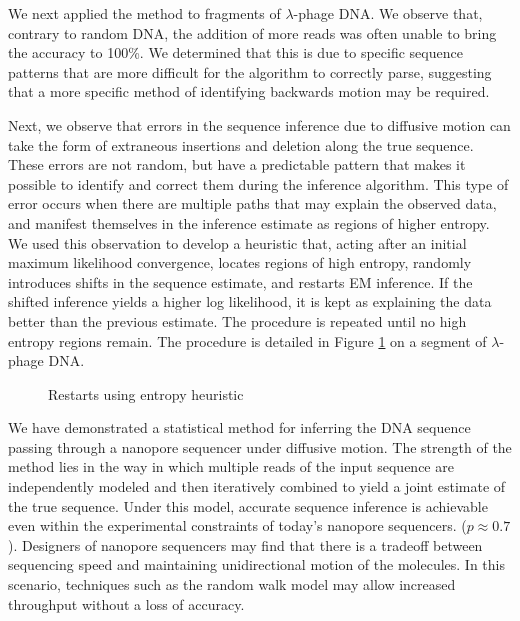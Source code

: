 \documentclass{biophys_letter}
\begin{document}
We next applied the method to fragments of $\lambda$-phage DNA.
We observe that, contrary to random DNA, the addition of more reads was often unable to bring the accuracy to 100\%.
We determined that this is due to specific sequence patterns that are more difficult for the algorithm to correctly parse, suggesting that a more specific method of identifying backwards motion may be required.

Next, we observe that errors in the sequence inference due to diffusive motion can take the form of extraneous insertions and deletion along the true sequence.
These errors are not random, but have a predictable pattern that makes it possible to identify and correct them during the inference algorithm.
This type of error occurs when there are multiple paths that may explain the observed data, and manifest themselves in the inference estimate as regions of higher entropy.
We used this observation to develop a heuristic that, acting after an initial maximum likelihood convergence, locates regions of high entropy, randomly introduces shifts in the sequence estimate, and restarts EM inference.
If the shifted inference yields a higher log likelihood, it is kept as explaining the data better than the previous estimate.
The procedure is repeated until no high entropy regions remain.
The procedure is detailed in Figure \ref{fig:entropy_restarts} on a segment of $\lambda$-phage DNA.

\begin{figure}
\caption{Restarts using entropy heuristic}
\label{fig:entropy_restarts}
\end{figure}

We have demonstrated a statistical method for inferring the DNA sequence passing through a nanopore sequencer under diffusive motion.
The strength of the method lies in the way in which multiple reads of the input sequence are independently modeled and then iteratively combined to yield a joint estimate of the true sequence.
Under this model, accurate sequence inference is achievable even within the experimental constraints of today's nanopore sequencers. ($p \approx 0.7$).
Designers of nanopore sequencers may find that there is a tradeoff between sequencing speed and maintaining unidirectional motion of the molecules.
In this scenario, techniques such as the random walk model may allow increased throughput without a loss of accuracy.
\end{document}
